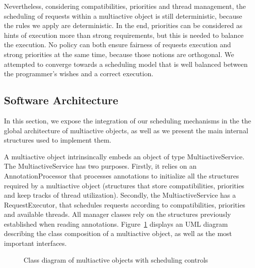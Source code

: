 \documentclass[11pt]{report}
\begin{document}
Nevertheless, considering compatibilities, priorities and thread management, the scheduling of requests within a multiactive object is still deterministic, because the rules we apply are deterministic. In the end, priorities can be considered as hints of execution more than strong requirements, but this is needed to balance the execution. No policy can both ensure fairness of requests execution and strong priorities at the same time, because those notions are orthogonal. We attempted to converge towards a scheduling model that is well balanced between the programmer's wishes and a correct execution.


\subsection{Software Architecture}
In this section, we expose the integration of our scheduling mechanisms in the  the global architecture of multiactive objects, as well as we present the main internal structures used to implement them.

A multiactive object intrinsincally embeds an object of type MultiactiveService. The MultiactiveService has two purposes. Firstly, it relies on an AnnotationProcessor that processes annotations to initialize all the structures required by a multiactive object (structures that store compatibilities, priorities and keep tracks of thread utilization). Secondly, the MultiactiveService has a RequestExecutor, that schedules requests according to compatibilities, priorities and available threads. All manager classes rely on the structures previously established when reading annotations. Figure~\ref{fig:uml} displays an UML diagram describing the class composition of a multiactive object, as well as the most important interfaces.

\begin{figure}[!ht]
      \caption{Class diagram of multiactive objects with scheduling controls}
      \label{fig:uml} 
\end{figure}
\end{document}

